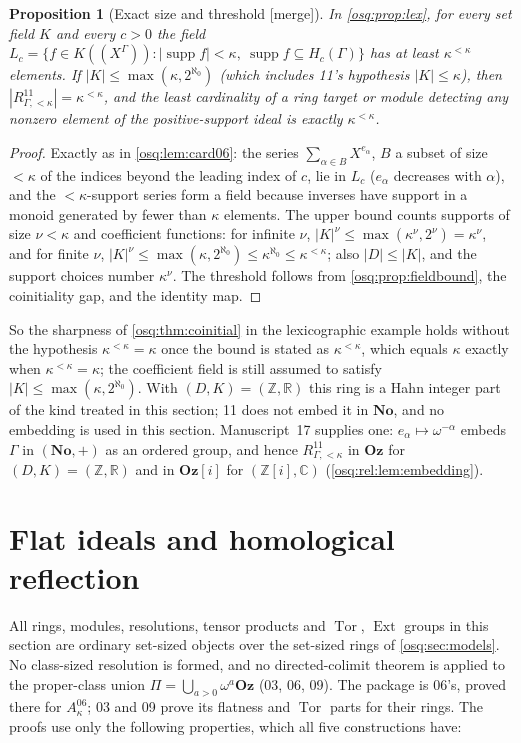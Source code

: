 \documentclass[11pt,letterpaper]{article}
\numberwithin{equation}{section}
\newtheorem{proposition}[proposition]{Proposition}
\theoremstyle{definition}
\theoremstyle{remark}
\theoremstyle{plain}
\newcommand{\No}{\mathbf{No}}
\newcommand{\Oz}{\mathbf{Oz}}
\newcommand{\GOz}{\Oz[i]}
\newcommand{\Z}{\mathbb Z}
\newcommand{\R}{\mathbb R}
\newcommand{\C}{\mathbb C}
\newcommand{\hahn}[2]{#1(\!(X^{#2})\!)}
\newcommand{\supp}{\operatorname{supp}}
\newcommand{\Tor}{\operatorname{Tor}}
\newcommand{\Ext}{\operatorname{Ext}}
\newcommand{\merge}{\textup{\textsf{[merge]}}}
\begin{document}
\begin{proposition}[Exact size and threshold \merge]\label{osq:prop:card11}
In \cref{osq:prop:lex}, for every set field $K$ and every $c>0$ the field
$L_c=\{f\in\hahn K\Gamma:|\supp f|<\kappa,\ \supp f\subseteq H_c(\Gamma)\}$ has at least $\kappa^{<\kappa}$
elements. If $|K|\le\max(\kappa,2^{\aleph_0})$ (which includes 11's hypothesis $|K|\le\kappa$), then
$|R^{11}_{\Gamma,<\kappa}|=\kappa^{<\kappa}$, and the least cardinality of a
ring target or module detecting any nonzero element of the positive-support ideal is exactly $\kappa^{<\kappa}$.
\end{proposition}
\begin{proof}
Exactly as in \cref{osq:lem:card06}: the series $\sum_{\alpha\in B}X^{e_\alpha}$, $B$ a subset of size $<\kappa$
of the indices beyond the leading index of $c$, lie in $L_c$ ($e_\alpha$ decreases with $\alpha$), and the
$<\kappa$-support series form a field because inverses have support in a monoid generated by fewer than $\kappa$
elements. The upper bound counts supports of size $\nu<\kappa$ and coefficient functions: for infinite $\nu$,
$|K|^\nu\le\max(\kappa^\nu,2^\nu)=\kappa^\nu$, and for finite $\nu$,
$|K|^\nu\le\max(\kappa,2^{\aleph_0})\le\kappa^{\aleph_0}\le\kappa^{<\kappa}$; also $|D|\le|K|$, and the
support choices number $\kappa^\nu$.
The threshold follows from \cref{osq:prop:fieldbound}, the coinitiality gap, and the identity map.
\end{proof}

So the sharpness of \cref{osq:thm:coinitial} in the lexicographic example holds without the hypothesis
$\kappa^{<\kappa}=\kappa$ once the bound is stated as $\kappa^{<\kappa}$, which equals $\kappa$ exactly when
$\kappa^{<\kappa}=\kappa$; the coefficient field is still assumed to satisfy $|K|\le\max(\kappa,2^{\aleph_0})$.
With $(D,K)=(\Z,\R)$ this ring is a Hahn integer part of the kind treated in this section; 11 does not
embed it in $\No$, and no embedding is used in this section. Manuscript~17 supplies one: $e_\alpha\mapsto\omega^{-\alpha}$
embeds $\Gamma$ in $(\No,+)$ as an ordered group, and hence $R^{11}_{\Gamma,<\kappa}$ in $\Oz$ for $(D,K)=(\Z,\R)$ and in $\GOz$
for $(\Z[i],\C)$ (\cref{osq:rel:lem:embedding}).

\section{Flat ideals and homological reflection}\label{osq:sec:homological}

All rings, modules, resolutions, tensor products and $\Tor$, $\Ext$ groups in this section are
ordinary set-sized objects over the set-sized rings of \cref{osq:sec:models}. No class-sized
resolution is formed, and no directed-colimit theorem is applied to the proper-class union
$\Pi=\bigcup_{a>0}\omega^a\Oz$ (03, 06, 09). The package is 06's, proved there for $A^{06}_\kappa$;
03 and 09 prove its flatness and $\Tor$ parts for their rings. The proofs use only the following
properties, which all five constructions have:
\end{document}
